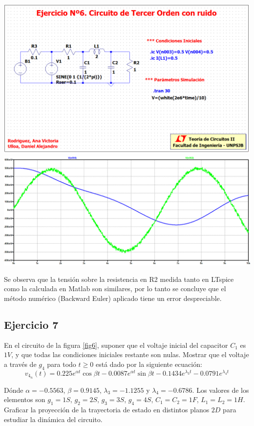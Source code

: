 \documentclass[10pt,a4paper]{article} %
\begin{document}
	\begin{center}
		\includegraphics[scale=0.5]{simulacion62}
		\includegraphics[scale=0.4]{simulacion61}
	\end{center}
 Se observa que la tensión sobre la resistencia en R2 medida tanto en LTspice como la calculada en Matlab son similares, por lo tanto se concluye que el método numérico (Backward Euler) aplicado tiene un error despreciable.
 
	\subsection{Ejercicio 7} En el circuito de la figura \ref{fig6}, suponer que el voltaje inicial del capacitor $C_1$ es $1V$, y que todas las condiciones iniciales restante son nulas. Mostrar que el voltaje a través de $g_4$ para todo $t\geq 0$ está dado por la siguiente ecuación:
	\begin{equation}
		v_{4_n}(t)=0.225e^{\alpha t}\cos \beta t-0.0087e^{\alpha t}\sin \beta t-0.1434e^{\lambda_3 t}-0.0791e^{\lambda_4 t}
	\end{equation}
	
	Dónde $\alpha=-0.5563$, $\beta=0.9145$, $\lambda_3=-1.1255$ y $\lambda_4=-0.6786$. Los valores de los elementos son $g_1=1S$, $g_2=2S$, $g_3=3S$, $g_4=4S$, $C_1=C_2=1F$, $L_1=L_2=1H$. Graficar la proyección de la trayectoria de estado en distintos planos $2D$ para estudiar la dinámica del circuito.\\
	
\end{document}
